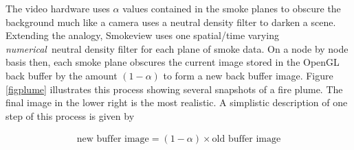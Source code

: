 The video hardware uses $\alpha$ values contained in the smoke planes to obscure the background much like a camera uses a neutral density filter to darken a scene.  Extending the analogy, Smokeview uses one spatial/time varying {\em numerical}\ neutral density filter for each plane of smoke data.  On a node by node basis then, each smoke plane obscures the current image stored in  the OpenGL back buffer by the amount $(1-\alpha)$ to form a new back buffer image.  Figure \ref{figplume} illustrates this process showing several snapshots of a fire plume. The final image in the lower right is the most realistic. A simplistic description of one step of this process is given by

\begin{eqnarray*}
\mbox{new buffer image} = (1-\alpha)\times \mbox{old buffer image}
\end{eqnarray*}


